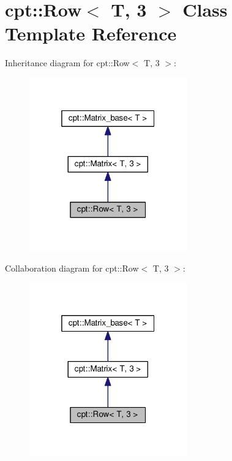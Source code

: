 \hypertarget{classcpt_1_1Row_3_01T_00_013_01_4}{}\section{cpt\+:\+:Row$<$ T, 3 $>$ Class Template Reference}
\label{classcpt_1_1Row_3_01T_00_013_01_4}


Inheritance diagram for cpt\+:\+:Row$<$ T, 3 $>$\+:
\nopagebreak
\begin{figure}[H]
\begin{center}
\leavevmode
\includegraphics[width=193pt]{classcpt_1_1Row_3_01T_00_013_01_4__inherit__graph}
\end{center}
\end{figure}


Collaboration diagram for cpt\+:\+:Row$<$ T, 3 $>$\+:
\nopagebreak
\begin{figure}[H]
\begin{center}
\leavevmode
\includegraphics[width=193pt]{classcpt_1_1Row_3_01T_00_013_01_4__coll__graph}
\end{center}
\end{figure}
